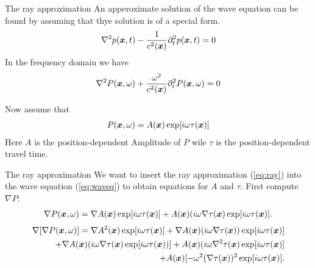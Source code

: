 \documentclass[xcolor=dvipsnames,notes]{beamer}
\begin{document}
\begin{frame}{The ray approximation}
An apperoximate solution of the wave equation can be
found by assuming that thye solution is of a special form.
%
\begin{eqnarray}
\nabla^2 p(\mbox{\boldmath $x$},t) - \frac{1}{c^2(\mbox{\boldmath $x$})}\partial^2_t p(\mbox{\boldmath $x$},t) = 0
\end{eqnarray}
%
In the frequency domain we have
\begin{eqnarray}
\nabla^2 P(\mbox{\boldmath $x$},\omega) + \frac{\omega^2}{c^2(\mbox{\boldmath $x$})}\partial^2_t P(\mbox{\boldmath $x$},\omega) = 0
                                 \label{eq:waveq}
\end{eqnarray}

Now assume that
\begin{eqnarray}
  P(\mbox{\boldmath $x$},\omega) = A(\mbox{\boldmath $x$})\exp[i\omega\tau(\mbox{\boldmath $x$})]
                      \label{eq:ray}
\end{eqnarray}  
Here $A$ is the position-dependent Amplitude of $P$ 
wile $\tau$ is the position-dependent travel time.
\end{frame}
\begin{frame}{The ray approximation}
We want to insert the ray approximation (\eqref{eq:ray}) into
the wave equation (\eqref{eq:waveq}) to obtain equations for $A$ and $\tau$.
First compute $\nabla P$:
\begin{eqnarray}
\nabla P(\mbox{\boldmath $x$},\omega) = \nabla A(\mbox{\boldmath $x$})\exp[i\omega\tau(\mbox{\boldmath $x$})] 
                       + A(\mbox{\boldmath $x$})(i\omega\nabla\tau(\mbox{\boldmath $x$})\exp[i\omega\tau(\mbox{\boldmath $x$})].
\end{eqnarray}
\begin{eqnarray}
\nabla[\nabla P(\mbox{\boldmath $x$},\omega)] = \nabla A^2(\mbox{\boldmath $x$})\exp[i\omega\tau(\mbox{\boldmath $x$})] 
                             + \nabla A(\mbox{\boldmath $x$})(i\omega\nabla\tau(\mbox{\boldmath $x$}))\exp[i\omega\tau(\mbox{\boldmath $x$})] \nonumber\\
                             + \nabla A(\mbox{\boldmath $x$})(i\omega\nabla\tau(\mbox{\boldmath $x$})\exp[i\omega\tau(\mbox{\boldmath $x$}))] 
                             + A(\mbox{\boldmath $x$})(i\omega\nabla^2\tau(\mbox{\boldmath $x$})\exp[i\omega\tau(\mbox{\boldmath $x$})]       \nonumber \\
                             + A(\mbox{\boldmath $x$})[-\omega^2(\nabla\tau(\mbox{\boldmath $x$}))^2\exp[i\omega\tau(\mbox{\boldmath $x$})].
\end{eqnarray}
\end{frame}
\end{document}
